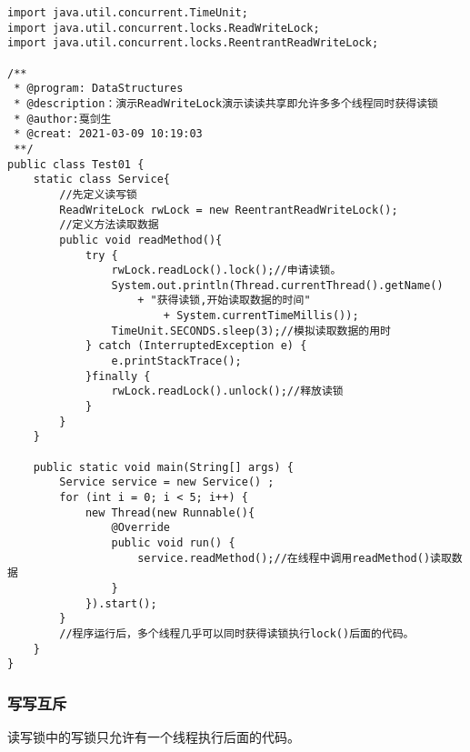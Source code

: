 \documentclass[a4paper]{report}
\begin{document}
\begin{Verbatim}[frame=single,numbersep=5pt,xleftmargin=1.5em,xrightmargin=1.5em]
import java.util.concurrent.TimeUnit;
import java.util.concurrent.locks.ReadWriteLock;
import java.util.concurrent.locks.ReentrantReadWriteLock;

/**
 * @program: DataStructures
 * @description：演示ReadWriteLock演示读读共享即允许多多个线程同时获得读锁
 * @author:戛剑生
 * @creat: 2021-03-09 10:19:03
 **/
public class Test01 {
    static class Service{
        //先定义读写锁
        ReadWriteLock rwLock = new ReentrantReadWriteLock();
        //定义方法读取数据
        public void readMethod(){
            try {
                rwLock.readLock().lock();//申请读锁。
                System.out.println(Thread.currentThread().getName()
                    + "获得读锁,开始读取数据的时间"
                        + System.currentTimeMillis());
                TimeUnit.SECONDS.sleep(3);//模拟读取数据的用时
            } catch (InterruptedException e) {
                e.printStackTrace();
            }finally {
                rwLock.readLock().unlock();//释放读锁
            }
        }
    }

    public static void main(String[] args) {
        Service service = new Service() ;
        for (int i = 0; i < 5; i++) {
            new Thread(new Runnable(){
                @Override
                public void run() {
                    service.readMethod();//在线程中调用readMethod()读取数据
                }
            }).start();
        }
        //程序运行后，多个线程几乎可以同时获得读锁执行lock()后面的代码。
    }
}\end{Verbatim}
\subsubsection{写写互斥}
读写锁中的写锁只允许有一个线程执行后面的代码。
\end{document}
